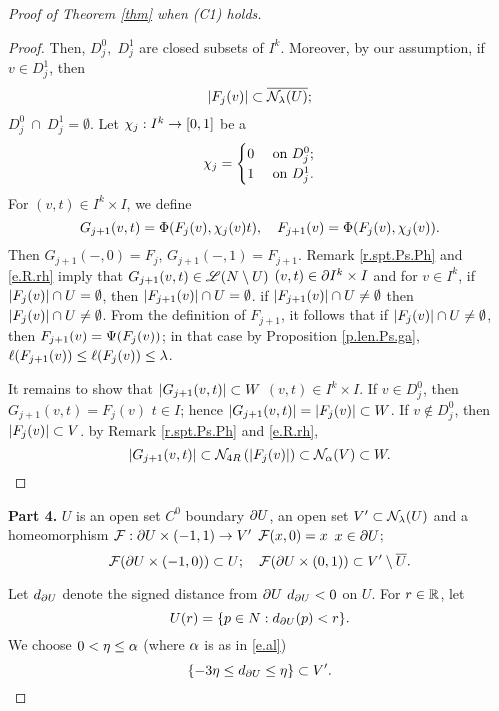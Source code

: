 \documentclass[11pt,twoside]{article}
\begin{document}
\begin{proof}[Proof of Theorem \ref{thm} when (C1) holds]
\begin{proof}
Then, \(D^0_j,\;D^1_j\) are closed subsets of \(I^k\). Moreover, by our assumption, if \(v\in D^1_j\), then
\[\left|F_j(v)\right|\subset \overline{\mathcal{N}_{\lambda}(U)};\]
\hn \(D^0_j\:\cap\: D^1_j=\emptyset\). Let \(\chi_j:I^k\rightarrow [0,1]\) be a \cts \fn \st 
\begin{equation}
\chi_j=\begin{cases}
0 &\text{ on } D^0_j;\\
1 &\text{ on } D^1_j.
\end{cases}
\end{equation}
For $(v,t)\in I^k\times I$, we define
\[G_{j+1}(v,t)=\Phi(F_j(v),\chi_j(v)t),\quad F_{j+1}(v)=\Phi(F_j(v),\chi_j(v)).\]
Then $G_{j+1}(-,0)=F_j$, $G_{j+1}(-,1)=F_{j+1}$. Remark \ref{r.spt.Ps.Ph} and \eqref{e.R.rh} imply that \(G_{j+1}(v,t)\in \mathscr{L} (N\setminus U)\) \fa \((v,t)\in \partial I^k\times I\) and for $v\in I^k$, if \(\left|F_{j}(v)\right|\cap U= \emptyset\), then \(\left|F_{j+1}(v)\right|\cap U= \emptyset\). \tf if \(\left|F_{j+1}(v)\right|\cap U\neq \emptyset\) then \(\left|F_{j}(v)\right|\cap U \neq \emptyset\). From the definition of $F_{j+1}$, it follows that if \(\left|F_{j}(v)\right|\cap U \neq \emptyset\), then \(F_{j+1}(v)=\Psi(F_j(v))\); in that case by Proposition \ref{p.len.Ps.ga}, $\ell(F_{j+1}(v))\leq \ell(F_{j}(v))\leq \lambda$. 

It remains to show that \(\left|G_{j+1}(v,t)\right|\subset W\) \fa \((v,t)\in I^k\times I\). If \(v\in D^0_j\), then \(G_{j+1}(v,t)=F_j(v)\) \fa \(t\in I\); hence \(\left|G_{j+1}(v,t)\right|=\left|F_j(v)\right|\subset W\). If \(v\notin D^0_j\), then \(\left|F_j(v)\right|\subset V\). \tf by Remark \ref{r.spt.Ps.Ph} and \eqref{e.R.rh},
\[\left|G_{j+1}(v,t)\right|\subset \mathcal{N}_{4R}\left(\left|F_j(v)\right|\right)\subset \mathcal{N}_{\alpha}(V)\subset W. \]
\end{proof}

\noindent\textbf{Part 4.} \Sn $U$ is an open set \w $C^0$ boundary $\partial U$, \tes an open set \(V'\subset \mathcal{N}_{\lambda}(U)\) and a homeomorphism \(\mathcal{F}:\partial U\times (-1,1)\rightarrow V'\) \st \(\mathcal{F}(x,0)=x\) \fa \(x\in \partial U\);
\begin{equation}
\mathcal{F}(\partial U \times (-1,0)) \subset U;\quad  \mathcal{F}(\partial U \times (0,1)) \subset V'\setminus \overline{U}.
\end{equation}

Let \(d_{\partial U}\) denote the signed distance from \(\partial U\) \st \(d_{\partial U}<0\) on \(U\). For \(r\in \mathbb{R}\), let 
\[U(r)=\{p\in N: d_{\partial U}(p)<r\}.\] We choose \(0<\eta\leq \alpha \) (where $\alpha$ is as in \eqref{e.al}) \sot 
\begin{equation}\label{e.et}
\{-3\eta \leq d_{\partial U}\leq \eta\} \subset V'.
\end{equation}


\end{proof}
\end{document}
